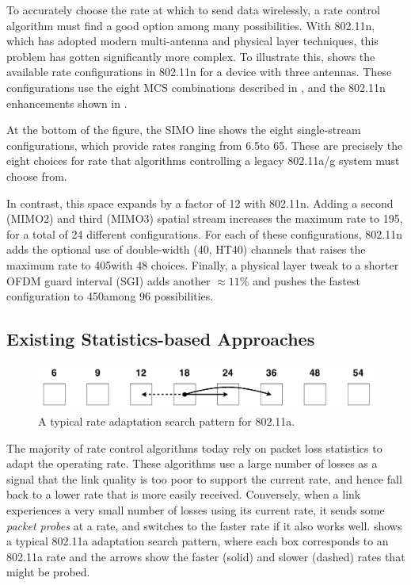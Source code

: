 To accurately choose the rate at which to send data wirelessly, a rate control algorithm must find a good option among many possibilities. With 802.11n, which has adopted modern multi-antenna and physical layer techniques, this problem has gotten significantly more complex. To illustrate this,  shows the available rate configurations in 802.11n for a device with three antennas. These configurations use the eight MCS combinations described in , and the 802.11n enhancements shown in .

At the bottom of the figure, the SIMO line shows the eight single-stream configurations, which provide rates ranging from 6.5\Mbps to 65\Mbps. These are precisely the eight choices for rate that algorithms controlling a legacy 802.11a/g system must choose from.

In contrast, this space expands by a factor of 12 with 802.11n. Adding a second (MIMO2) and third (MIMO3) spatial stream increases the maximum rate to 195\Mbps, for a total of 24 different configurations. For each of these configurations, 802.11n adds the optional use of double-width (40\MHz, HT40) channels that raises the maximum rate to 405\Mbps with 48 choices. Finally, a physical layer tweak to a shorter OFDM guard interval (SGI) adds another $\approx 11\%$ and pushes the fastest configuration to 450\Mbps among 96 possibilities.

\subsection{Existing Statistics-based Approaches}
\begin{figure}[t]
      \centering
      \includegraphics[scale=0.44]{figures/approach_figs/search_11a.pdf}
      \caption[Rate adaptation search pattern for 802.11a]{\label{fig:search_11a}A typical rate adaptation search pattern for 802.11a.}
\end{figure}
The majority of rate control algorithms today rely on packet loss statistics to adapt the operating rate. These algorithms use a large number of losses as a signal that the link quality is too poor to support the current rate, and hence fall back to a lower rate that is more easily received. Conversely, when a link experiences a very small number of losses using its current rate, it sends some \emph{packet probes} at a rate, and switches to the faster rate if it also works well.  shows a typical 802.11a adaptation search pattern, where each box corresponds to an 802.11a rate and the arrows show the faster (solid) and slower (dashed) rates that might be probed.

